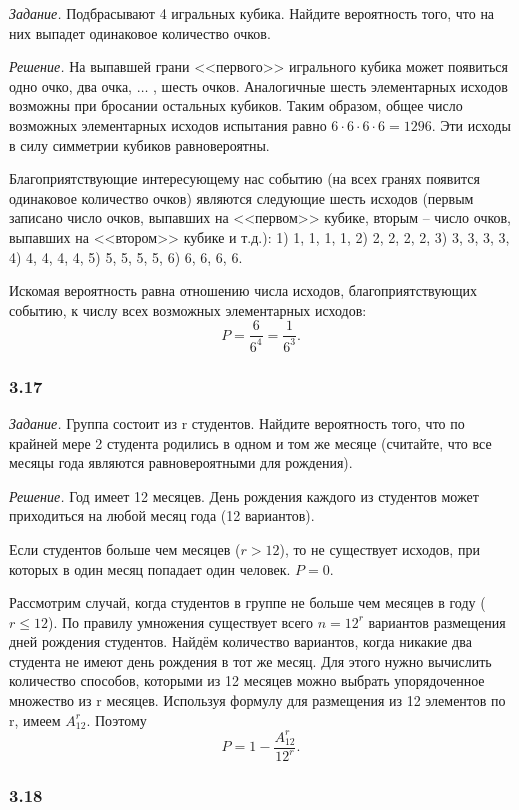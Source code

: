 \documentclass{book}
\begin{document}
\textit{Задание.} Подбрасывают 4 игральных кубика.
Найдите вероятность того, что на них выпадет одинаковое количество очков.

\textit{Решение.} На выпавшей грани <<первого>> игрального кубика может появиться одно очко, два очка,  $ \dotsc $ , шесть очков.
Аналогичные шесть элементарных исходов возможны при бросании остальных кубиков.
Таким образом, общее число возможных элементарных исходов испытания равно $ 6 \cdot 6 \cdot 6 \cdot 6 = 1296 $.
Эти исходы в силу симметрии кубиков равновероятны.

Благоприятствующие интересующему нас событию
(на всех гранях появится одинаковое количество очков)
являются следующие шесть исходов
(первым записано число очков,
выпавших на <<первом>> кубике,
вторым -- число очков, выпавших на <<втором>> кубике и т.д.): 1) 1, 1, 1, 1, 2) 2, 2, 2, 2, 3) 3, 3, 3, 3, 4) 4, 4, 4, 4, 5) 5, 5, 5, 5, 6) 6, 6, 6, 6.

Искомая вероятность равна отношению числа исходов, благоприятствующих событию, к числу всех возможных элементарных исходов:
$$ P =
\frac{6}{6^4} = \frac{1}{6^3}.$$

\subsubsection*{3.17}

\textit{Задание.} Группа состоит из r студентов.
Найдите вероятность того, что по крайней мере 2 студента родились в одном и том же месяце (считайте, что все месяцы года являются равновероятными для рождения).

\textit{Решение.} Год имеет 12 месяцев.
День рождения каждого из студентов может приходиться на любой месяц года (12 вариантов).

Если студентов больше чем месяцев ($ r > 12 $), то не существует исходов, при которых в один месяц попадает один человек.
$ P = 0 $.

Рассмотрим случай, когда студентов в группе не больше чем месяцев в году ($ r \leq 12 $).
По правилу умножения существует всего $ n = 12^r $ вариантов размещения дней рождения студентов.
Найдём количество вариантов, когда никакие два студента не имеют день рождения в тот же месяц.
Для этого нужно вычислить количество способов, которыми из 12 месяцев можно выбрать упорядоченное множество из r месяцев.
Используя формулу для размещения из 12 элементов по r, имеем $ A_{12}^r $.
Поэтому
$$ P =
1 - \frac{ A_{ 12 }^r }{ 12^r }.$$

\subsubsection*{3.18}
\end{document}
